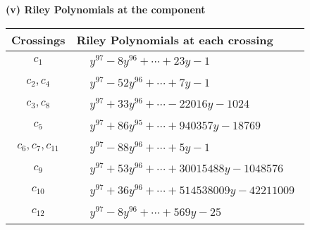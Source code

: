 \documentclass[1p]{elsarticle_modified}
\theoremstyle{definition}
\begin{document}
\newpage\renewcommand{\arraystretch}{1}
\flushleft \textbf{(v) Riley Polynomials at the component}\newline \\
\begin{tabular}{m{50pt}|m{274pt}}
Crossings & \hspace{64pt}Riley Polynomials at each crossing \\
\hline $$\begin{aligned}c_{1}\end{aligned}$$&$\begin{aligned}
&y^{97}-8 y^{96}+\cdots+23 y-1
\end{aligned}$\\
\hline $$\begin{aligned}c_{2},c_{4}\end{aligned}$$&$\begin{aligned}
&y^{97}-52 y^{96}+\cdots+7 y-1
\end{aligned}$\\
\hline $$\begin{aligned}c_{3},c_{8}\end{aligned}$$&$\begin{aligned}
&y^{97}+33 y^{96}+\cdots-22016 y-1024
\end{aligned}$\\
\hline $$\begin{aligned}c_{5}\end{aligned}$$&$\begin{aligned}
&y^{97}+86 y^{95}+\cdots+940357 y-18769
\end{aligned}$\\
\hline $$\begin{aligned}c_{6},c_{7},c_{11}\end{aligned}$$&$\begin{aligned}
&y^{97}-88 y^{96}+\cdots+5 y-1
\end{aligned}$\\
\hline $$\begin{aligned}c_{9}\end{aligned}$$&$\begin{aligned}
&y^{97}+53 y^{96}+\cdots+30015488 y-1048576
\end{aligned}$\\
\hline $$\begin{aligned}c_{10}\end{aligned}$$&$\begin{aligned}
&y^{97}+36 y^{96}+\cdots+514538009 y-42211009
\end{aligned}$\\
\hline $$\begin{aligned}c_{12}\end{aligned}$$&$\begin{aligned}
&y^{97}-8 y^{96}+\cdots+569 y-25
\end{aligned}$\\
\hline
\end{tabular}\\~\\
\end{document}
